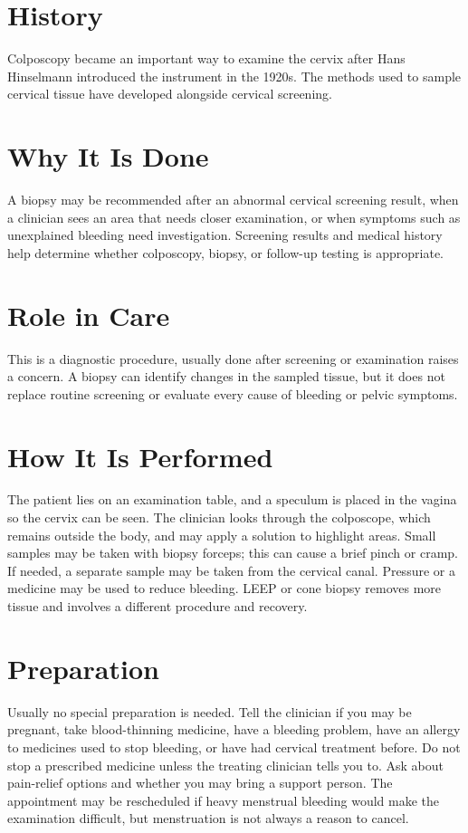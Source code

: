 \section*{History}
Colposcopy became an important way to examine the cervix after Hans Hinselmann introduced the instrument in the 1920s. The methods used to sample cervical tissue have developed alongside cervical screening.

\section*{Why It Is Done}
A biopsy may be recommended after an abnormal cervical screening result, when a clinician sees an area that needs closer examination, or when symptoms such as unexplained bleeding need investigation. Screening results and medical history help determine whether colposcopy, biopsy, or follow-up testing is appropriate.

\section*{Role in Care}
This is a diagnostic procedure, usually done after screening or examination raises a concern. A biopsy can identify changes in the sampled tissue, but it does not replace routine screening or evaluate every cause of bleeding or pelvic symptoms.

\section*{How It Is Performed}
The patient lies on an examination table, and a speculum is placed in the vagina so the cervix can be seen. The clinician looks through the colposcope, which remains outside the body, and may apply a solution to highlight areas. Small samples may be taken with biopsy forceps; this can cause a brief pinch or cramp. If needed, a separate sample may be taken from the cervical canal. Pressure or a medicine may be used to reduce bleeding. LEEP or cone biopsy removes more tissue and involves a different procedure and recovery.

\section*{Preparation}
Usually no special preparation is needed. Tell the clinician if you may be pregnant, take blood-thinning medicine, have a bleeding problem, have an allergy to medicines used to stop bleeding, or have had cervical treatment before. Do not stop a prescribed medicine unless the treating clinician tells you to. Ask about pain-relief options and whether you may bring a support person. The appointment may be rescheduled if heavy menstrual bleeding would make the examination difficult, but menstruation is not always a reason to cancel.

